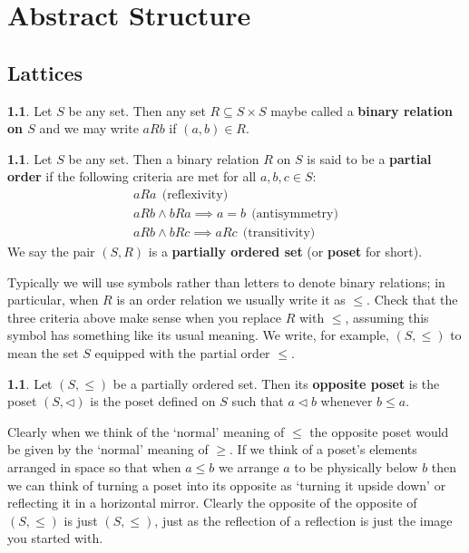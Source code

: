 \documentclass[oneside,english]{amsbook}
\numberwithin{section}{chapter}
\theoremstyle{plain}
\theoremstyle{definition}
\newtheorem{defn}[thm]{\protect\definitionname}
\providecommand{\definitionname}{Definition}
\begin{document}
\chapter{Abstract Structure}

\section{Lattices} 

\begin{defn} 
	Let $S$ be any set. Then any set $R\subseteq S\times S$ maybe called a \textbf{binary relation on $S$} and we may write $aRb$ if $(a,b)\in R$. 
\end{defn}


\begin{defn} 
	Let $S$ be any set. Then a binary relation $R$ on $S$ is said to be a \textbf{partial order }if the following criteria are met for all $a,b,c\in S$: 
	\begin{eqnarray*} 
		aRa\ \ \text{(reflexivity)}\\ 
		aRb\land bRa\implies a=b\ \ \text{(antisymmetry)}\\ 
		aRb\land bRc\implies aRc\ \ \text{(transitivity)} 
	\end{eqnarray*}
	 We say the pair $(S,R)$ is a \textbf{partially ordered set} (or \textbf{poset }for short). 
\end{defn} 

Typically we will use symbols rather than letters to denote binary relations; in particular, when $R$ is an order relation we usually write it as $\le$. Check that the three criteria above make sense when you replace $R$ with $\le$, assuming this symbol has something like its usual meaning. We write, for example, $(S,\le)$ to mean the set $S$ equipped with the partial order $\le$. 

\begin{defn} 
	Let $(S,\le)$ be a partially ordered set. Then its \textbf{opposite poset} is the poset $(S,\lhd)$ is the poset defined on $S$ such that $a\lhd b$ whenever $b\le a$. 
\end{defn} 

Clearly when we think of the `normal' meaning of $\le$ the opposite poset would be given by the `normal' meaning of $\ge$. If we think of a poset's elements arranged in space so that when $a\le b$ we arrange $a$ to be physically below $b$ then we can think of turning a poset into its opposite as `turning it upside down' or reflecting it in a horizontal mirror. Clearly the opposite of the opposite of $(S,\le)$ is just $(S,\le)$, just as the reflection of a reflection is just the image you started with. 
\end{document}
